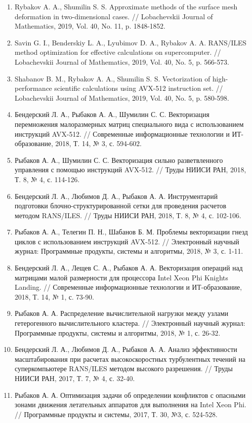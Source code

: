 \documentclass[a4paper,14pt]{extarticle}                     %
\theoremstyle{plain}                                         %
\begin{document}
\begin{enumerate}
\item Rybakov A. A., Shumilin S. S. Approximate methods of the surface mesh deformation in two-dimensional cases. // Lobachevskii Journal of Mathematics, 2019, Vol. 40, No. 11, p. 1848-1852.
\item Savin G. I., Benderskiy L. A., Lyubimov D. A., Rybakov A. A. RANS/ILES method optimization for effective calculations on supercomputer. // Lobachevskii Journal of Mathematics, 2019, Vol. 40, No. 5, p. 566-573.
\item Shabanov B. M., Rybakov A. A., Shumilin S. S. Vectorization of high-performance scientific calculations using AVX-512 instruction set. // Lobachevskii Journal of Mathematics, 2019, Vol. 40, No. 5, p. 580-598.
\item Бендерский Л. А., Рыбаков А. А., Шумилин С. С. Векторизация перемножения малоразмерных матриц специального вида с использованием инструкций AVX-512. // Современные информационные технологии и ИТ-образование, 2018, Т. 14, № 3, с. 594-602.
\item Рыбаков А. А., Шумилин С. С. Векторизация сильно разветвленного управления с помощью инструкций AVX-512. // Труды НИИСИ РАН, 2018, Т. 8, № 4, с. 114-126.
\item Бендерский Л. А., Любимов Д. А., Рыбаков А. А. Инструментарий подготовки блочно-структурированной сетки для проведения расчетов методом RANS/ILES. // Труды НИИСИ РАН, 2018, Т. 8, № 4, с. 102-106.
\item Рыбаков А. А., Телегин П. Н., Шабанов Б. М. Проблемы векторизации гнезд циклов с использованием инструкций AVX-512. // Электронный научный журнал: Программные продукты, системы и алгоритмы, 2018, № 3, с. 1-11.
\item Бендерский Л. А., Лещев С. А., Рыбаков А. А. Векторизация операций над матрицами малой размерности для процессора Intel Xeon Phi Knights Landing. // Современные информационные технологии и ИТ-образование, 2018, Т. 14, № 1, с. 73-90.
\item Рыбаков А. А. Распределение вычислительной нагрузки между узлами гетерогенного вычислительного кластера. // Электронный научный журнал: Программные продукты, системы и алгоритмы, 2018, № 1, с. 26-32.
\item Бендерский Л. А., Любимов Д. А., Рыбаков А. А. Анализ эффективности масштабирования при расчетах высокоскоростных турбулентных течений на суперкомпьютере RANS/ILES методом высокого разрешения. // Труды НИИСИ РАН, 2017, Т. 7, № 4, с. 32-40.
\item Рыбаков А. А. Оптимизация задачи об определении конфликтов с опасными зонами движения летательных аппаратов для выполнения на Intel Xeon Phi. // Программные продукты и системы, 2017, Т. 30, №3, с. 524-528.

\end{enumerate}
\end{document}
